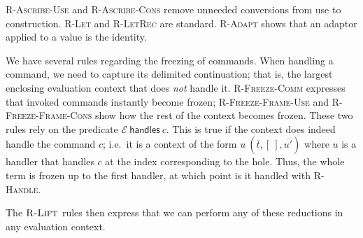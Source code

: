 \documentclass[msc,deptreport,cs]{infthesis} %
\newcommand{\many}{\overline}
\newcommand{\EC}{\mathcal{E}}
\begin{document}
\textsc{R-Ascribe-Use} and \textsc{R-Ascribe-Cons} remove unneeded conversions
from use to construction. \textsc{R-Let} and \textsc{R-LetRec} are standard.
\textsc{R-Adapt} shows that an adaptor applied to a value is the identity.

We have several rules regarding the freezing of commands. When handling a
command, we need to capture its delimited continuation; that is, the largest
enclosing evaluation context that does \emph{not} handle it.
\textsc{R-Freeze-Comm} expresses that invoked commands instantly become frozen;
\textsc{R-Freeze-Frame-Use} and \textsc{R-Freeze-Frame-Cons} show how the rest
of the context becomes frozen. These two rules rely on the predicate $\EC~
\textsf{handles}~c$. This is true if the context does indeed handle the
command $c$; i.e.\ it is a context of the form $u~(\many{t}, [~], \many{u'})$
where $u$ is a handler that handles $c$ at the index corresponding to the hole.
Thus, the whole term is frozen up to the first handler, at which point is it
handled with \textsc{R-Handle}.

The $\textsc{R-Lift}$ rules then express that we can perform any of these
reductions in any evaluation context.
\end{document}
